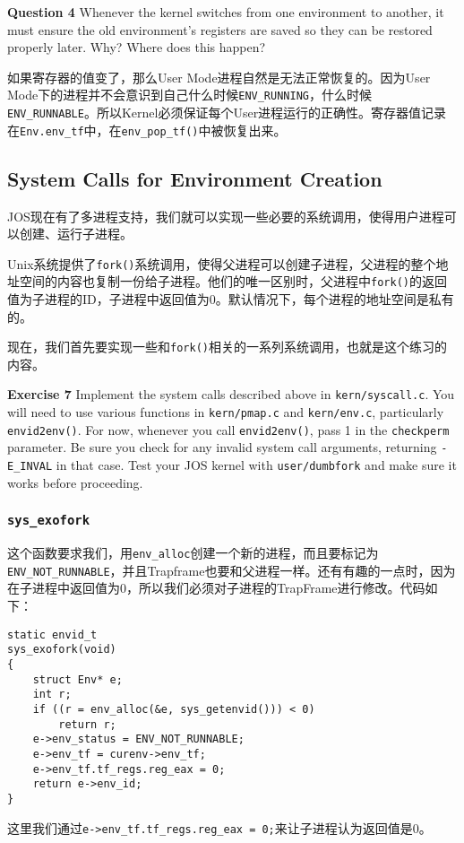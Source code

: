 \documentclass[11pt]{article}
\begin{document}
\begin{framed}
\noindent\textbf{Question 4} Whenever the kernel switches from one environment to another, it must ensure the old environment's registers are saved so they can be restored properly later. Why? Where does this happen?
\end{framed}
如果寄存器的值变了，那么User Mode进程自然是无法正常恢复的。因为User Mode下的进程并不会意识到自己什么时候\lstinline|ENV_RUNNING|，什么时候\lstinline|ENV_RUNNABLE|。所以Kernel必须保证每个User进程运行的正确性。寄存器值记录在\lstinline|Env.env_tf|中，在\lstinline|env_pop_tf()|中被恢复出来。

\subsection{System Calls for Environment Creation}
JOS现在有了多进程支持，我们就可以实现一些必要的系统调用，使得用户进程可以创建、运行子进程。 

Unix系统提供了\lstinline|fork()|系统调用，使得父进程可以创建子进程，父进程的整个地址空间的内容也复制一份给子进程。他们的唯一区别时，父进程中\lstinline|fork()|的返回值为子进程的ID，子进程中返回值为0。默认情况下，每个进程的地址空间是私有的。

现在，我们首先要实现一些和\lstinline|fork()|相关的一系列系统调用，也就是这个练习的内容。
\begin{framed}
\noindent\textbf{Exercise 7} Implement the system calls described above in \lstinline|kern/syscall.c|. You will need to use various functions in \lstinline|kern/pmap.c| and \lstinline|kern/env.c|, particularly \lstinline|envid2env()|. For now, whenever you call \lstinline|envid2env()|, pass 1 in the \lstinline|checkperm| parameter. Be sure you check for any invalid system call arguments, returning \lstinline|-E_INVAL| in that case. Test your JOS kernel with \lstinline|user/dumbfork| and make sure it works before proceeding.
\end{framed}

\subsubsection{\lstinline|sys_exofork|}
这个函数要求我们，用\lstinline|env_alloc|创建一个新的进程，而且要标记为\lstinline|ENV_NOT_RUNNABLE|，并且Trapframe也要和父进程一样。还有有趣的一点时，因为在子进程中返回值为0，所以我们必须对子进程的TrapFrame进行修改。代码如下：
\begin{lstlisting}[title=kern/syscall.c]
static envid_t
sys_exofork(void)
{
	struct Env* e;
	int r;
	if ((r = env_alloc(&e, sys_getenvid())) < 0)
		return r;
	e->env_status = ENV_NOT_RUNNABLE;
	e->env_tf = curenv->env_tf;
	e->env_tf.tf_regs.reg_eax = 0;
	return e->env_id;
}
\end{lstlisting}
这里我们通过\lstinline|e->env_tf.tf_regs.reg_eax = 0;|来让子进程认为返回值是0。
\end{document}
